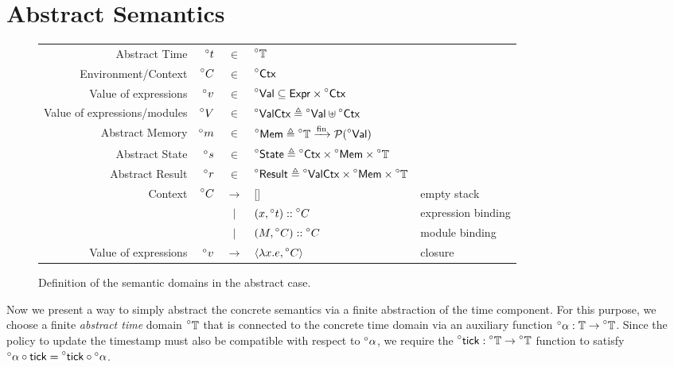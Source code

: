 \documentclass[acmsmall,screen,review]{acmart}\settopmatter{printfolios=true,printccs=false,printacmref=false}
\newcommand*{\vbar}{|}
\newcommand*{\cons}{::}
\newcommand*{\pset}{\mathcal{P}}
\newcommand*{\A}[1]{\prescript{\circ}{}{#1}}
\newcommand*{\Expr}{\mathsf{Expr}}
\newcommand*{\Time}{\mathbb{T}}
\newcommand*{\Ctx}{\mathsf{Ctx}}
\newcommand*{\Value}{\mathsf{Val}}
\newcommand*{\Mem}{\mathsf{Mem}}
\newcommand*{\mem}{m}
\newcommand*{\State}{\mathsf{State}}
\newcommand*{\Result}{\mathsf{Result}}
\newcommand*{\fin}[2]{{#1}\xrightarrow{\text{fin}}{#2}}
\newcommand*{\tick}{\mathsf{tick}}
\begin{document}
\section{Abstract Semantics}
\begin{figure}[t!]
  \footnotesize
  \centering
  \begin{tabular}{rrcll}
    Abstract Time                & $\A{t}$    & $\in$         & $\A{\Time}$                                                                               \\
    Environment/Context          & $\A{C}$    & $\in$         & $\A{\Ctx}$                                                                                \\
    Value of expressions         & $\A{v}$    & $\in$         & $\A{\Value} \subseteq \Expr\times\A{\Ctx}$                                                \\
    Value of expressions/modules & $\A{V}$    & $\in$         & $\A{\Value\Ctx}\triangleq\A{\Value}\uplus\A{\Ctx}$                                        \\
    Abstract Memory              & $\A{\mem}$ & $\in$         & $\A{\Mem} \triangleq \fin{\A{\Time}}{\pset(\A{\Value})}$                                  \\
    Abstract State               & $\A{s}$    & $\in$         & $\A{\State} \triangleq \A{\Ctx}\times\A{\Mem}\times\A{\Time}$                             \\
    Abstract Result              & $\A{r}$    & $\in$         & $\A{\Result} \triangleq \A{\Value\Ctx}\times\A{\Mem}\times\A{\Time}$                      \\
    Context                      & $\A{C}$    & $\rightarrow$ & []                                                                   & empty stack        \\
                                 &            & $\vbar$       & $(x,\A{t})\cons \A{C}$                                               & expression binding \\
                                 &            & $\vbar$       & $(M,\A{C})\cons \A{C}$                                               & module binding     \\
    Value of expressions         & $\A{v}$    & $\rightarrow$ & $\langle \lambda x.e, \A{C} \rangle$                                 & closure
  \end{tabular}
  \caption{Definition of the semantic domains in the abstract case.}
  \label{fig:absdom}
\end{figure}
Now we present a way to simply abstract the concrete semantics via a finite abstraction of the time component.
For this purpose, we choose a finite \emph{abstract time} domain $\A\Time$ that is connected to the concrete time domain via an auxiliary function $\A\alpha:\Time\rightarrow\A\Time$.
Since the policy to update the timestamp must also be compatible with respect to $\A\alpha$, we require the $\A\tick:\A\Time\rightarrow\A\Time$ function to satisfy $\A\alpha\circ\tick=\A\tick\circ\A\alpha$.
\end{document}
